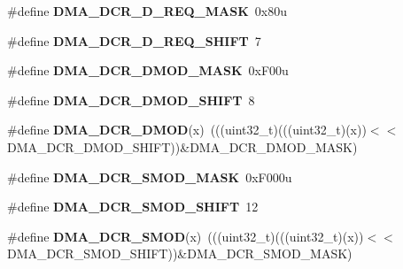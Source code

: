 \begin{DoxyCompactItemize}
\item 
\mbox{\label{group___d_m_a___register___masks_ga8ac0ee4daba5e6b55e3dacf8850c6d85}} 
\#define {\bfseries D\+M\+A\+\_\+\+D\+C\+R\+\_\+\+D\+\_\+\+R\+E\+Q\+\_\+\+M\+A\+SK}~0x80u
\item 
\mbox{\label{group___d_m_a___register___masks_ga9d98a83ee41a26845e41b7cd8917479a}} 
\#define {\bfseries D\+M\+A\+\_\+\+D\+C\+R\+\_\+\+D\+\_\+\+R\+E\+Q\+\_\+\+S\+H\+I\+FT}~7
\item 
\mbox{\label{group___d_m_a___register___masks_ga0d30381585aa7d7a13a3b5d349187781}} 
\#define {\bfseries D\+M\+A\+\_\+\+D\+C\+R\+\_\+\+D\+M\+O\+D\+\_\+\+M\+A\+SK}~0x\+F00u
\item 
\mbox{\label{group___d_m_a___register___masks_ga83936f94b10ed7a680004a898274875c}} 
\#define {\bfseries D\+M\+A\+\_\+\+D\+C\+R\+\_\+\+D\+M\+O\+D\+\_\+\+S\+H\+I\+FT}~8
\item 
\mbox{\label{group___d_m_a___register___masks_gabb9c13671b43c6561c6ee77e0158665d}} 
\#define {\bfseries D\+M\+A\+\_\+\+D\+C\+R\+\_\+\+D\+M\+OD}(x)~(((uint32\+\_\+t)(((uint32\+\_\+t)(x))$<$$<$D\+M\+A\+\_\+\+D\+C\+R\+\_\+\+D\+M\+O\+D\+\_\+\+S\+H\+I\+FT))\&D\+M\+A\+\_\+\+D\+C\+R\+\_\+\+D\+M\+O\+D\+\_\+\+M\+A\+SK)
\item 
\mbox{\label{group___d_m_a___register___masks_gac1240160400703410f467f172117850f}} 
\#define {\bfseries D\+M\+A\+\_\+\+D\+C\+R\+\_\+\+S\+M\+O\+D\+\_\+\+M\+A\+SK}~0x\+F000u
\item 
\mbox{\label{group___d_m_a___register___masks_ga72bcd718d03993e1f6faaef56f87c317}} 
\#define {\bfseries D\+M\+A\+\_\+\+D\+C\+R\+\_\+\+S\+M\+O\+D\+\_\+\+S\+H\+I\+FT}~12
\item 
\mbox{\label{group___d_m_a___register___masks_gae478a83c676d7a843fa9e25f029def9c}} 
\#define {\bfseries D\+M\+A\+\_\+\+D\+C\+R\+\_\+\+S\+M\+OD}(x)~(((uint32\+\_\+t)(((uint32\+\_\+t)(x))$<$$<$D\+M\+A\+\_\+\+D\+C\+R\+\_\+\+S\+M\+O\+D\+\_\+\+S\+H\+I\+FT))\&D\+M\+A\+\_\+\+D\+C\+R\+\_\+\+S\+M\+O\+D\+\_\+\+M\+A\+SK)

\end{DoxyCompactItemize}
